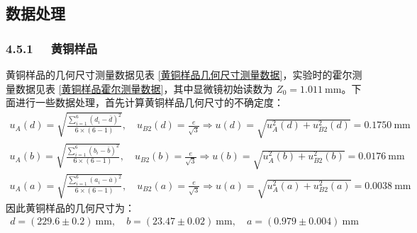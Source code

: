 \documentclass[UTF8]{article}
\theoremstyle{MyLineTheoremStyle} %
\theoremstyle{MyBlockTheoremStyle} %
\theoremstyle{MySubsubsectionStyle} %
\begin{document}
\subsection{数据处理}

\subsubsection*{4.5.1 \ \ 黄铜样品}

黄铜样品的几何尺寸测量数据见表 \ref{黄铜样品几何尺寸测量数据}，实验时的霍尔测量数据见表 \ref{黄铜样品霍尔测量数据}，其中显微镜初始读数为 $Z_0 = 1.011 \ \mathrm{mm}$。下面进行一些数据处理，首先计算黄铜样品几何尺寸的不确定度：
\begin{gather}
u_A(d) = \sqrt{\frac{\sum_{i=1}^{6}\left(d_i - \overline{d}\right)^2}{6\times (6 - 1)}} ,\quad u_{B2}(d) = \frac{e}{\sqrt{3}} \Longrightarrow u(d) = \sqrt{u_A^2(d) + u_{B2}^2(d)} = 0.1750 \ \mathrm{mm} \\
u_A(b) = \sqrt{\frac{\sum_{i=1}^{6}\left(b_i - \overline{b}\right)^2}{6\times (6 - 1)}} ,\quad u_{B2}(b) = \frac{e}{\sqrt{3}} \Longrightarrow u(b) = \sqrt{u_A^2(b) + u_{B2}^2(b)} = 0.0176 \ \mathrm{mm} \\ 
u_A(a) = \sqrt{\frac{\sum_{i=1}^{6}\left(a_i - \overline{a}\right)^2}{6\times (6 - 1)}} ,\quad u_{B2}(a) = \frac{e}{\sqrt{3}} \Longrightarrow u(a) = \sqrt{u_A^2(a) + u_{B2}^2(a)} = 0.0038 \ \mathrm{mm}
\end{gather}
因此黄铜样品的几何尺寸为：
\begin{gather}
    d = (229.6 \pm 0.2) \ \mathrm{mm},\quad 
    b = (23.47 \pm 0.02) \ \mathrm{mm},\quad  
    a = (0.979 \pm 0.004) \ \mathrm{mm}
\end{gather}
\end{document}
